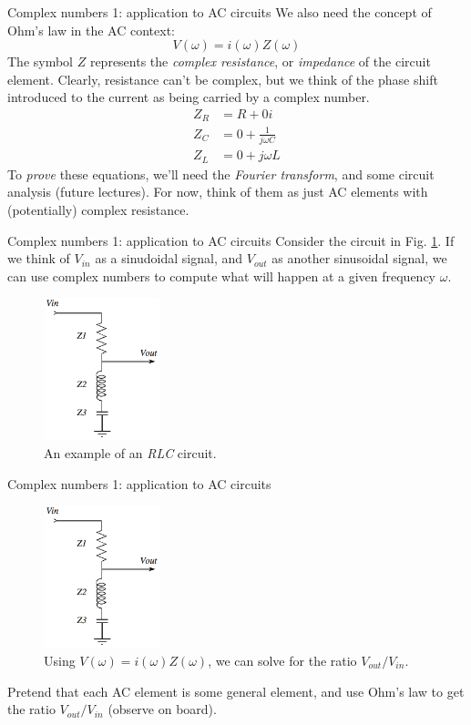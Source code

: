 \documentclass{beamer}
\begin{document}
\begin{frame}{Complex numbers 1: application to AC circuits}
\small
We also need the concept of Ohm's law in the AC context:
\begin{equation}
V(\omega) = i(\omega) Z(\omega)
\end{equation}
The symbol $Z$ represents the \textit{complex resistance}, or \textit{impedance} of the circuit element.  Clearly, resistance can't be complex, but we think of the phase shift introduced to the current as being carried by a complex number.
\begin{align}
Z_R &= R + 0i \\
Z_C &= 0 + \frac{1}{j\omega C} \\
Z_L &= 0 + j \omega L
\end{align}
To \textit{prove} these equations, we'll need the \textit{Fourier transform}, and some circuit analysis (future lectures).  For now, think of them as just AC elements with (potentially) complex resistance.
\end{frame}

\begin{frame}{Complex numbers 1: application to AC circuits}
\small
Consider the circuit in Fig. \ref{fig:RLC1}.  If we think of $V_{in}$ as a sinudoidal signal, and $V_{out}$ as another sinusoidal signal, we can use complex numbers to compute what will happen at a given frequency $\omega$.
\begin{figure}
\centering
\includegraphics[width=0.3\textwidth]{figures/RLC1.png}
\caption{\label{fig:RLC1}  An example of an \textit{RLC} circuit.}
\end{figure}
\end{frame}

\begin{frame}{Complex numbers 1: application to AC circuits}
\small
\begin{figure}
\centering
\includegraphics[width=0.3\textwidth]{figures/RLC1.png}
\caption{\label{fig:RLC2}  Using $V(\omega) = i(\omega) Z(\omega)$, we can solve for the ratio $V_{out}/V_{in}$.}
\end{figure}
Pretend that each AC element is some general element, and use Ohm's law to get the ratio $V_{out}/V_{in}$ (observe on board).
\end{frame}
\end{document}
